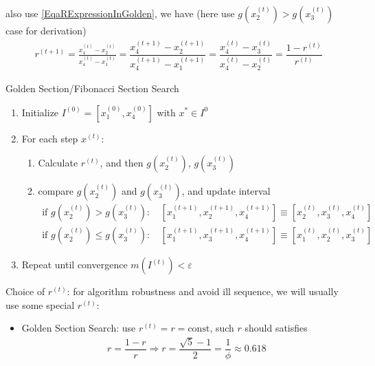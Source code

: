         also use \autoref{EqaRExpressionInGolden}, we have (here use $g(x_2^{(t)})> g(x_3^{(t)}) $ case for derivation)
        \begin{align}
            r^{(t+1)}=\frac{x_4^{(t)}-x_2^{(t)}}{x_4^{(t)}-x_1^{(t)}}=\dfrac{x_4^{(t+1)}-x_2^{(t+1)}}{x_4^{(t+1)}-x_1^{(t+1)}}=\dfrac{x_4^{(t)}-x_3^{(t)}}{x_4^{(t)}-x_2^{(t)}}=\dfrac{1-r^{(t)}}{r^{(t)}}
        \end{align}
        

\begin{algorithm}{Golden Section/Fibonacci Section Search}

\begin{enumerate}[topsep=2pt,itemsep=2pt]
    \item Initialize $ I^{(0)}=[x_1^{(0)},x_4^{(0)}] $ with $ x^*\in I^{0} $
    \item For each step $ x^{(t)} $:
    \begin{enumerate}[topsep=2pt,itemsep=2pt]
        \item Calculate $ r^{(t)} $, and then $ g(x_2^{(t)}) $, $ g(x_{3}^{(t)}) $
        \item compare $ g(x_2^{(t)}) $ and $ g(x_3^{(t)}) $, and update interval    
        \begin{align}
            \text{if }g(x_2^{(t)})>g(x_3^{(t)}):&\, [x_1^{(t+1)},x_2^{(t+1)},x_4^{(t+1)}]\equiv [x_2^{(t)},x_3^{(t)},x_4^{(t)}]\\
            \text{if }g(x_2^{(t)})\leq g(x_3^{(t)}):&\, [x_1^{(t+1)},x_3^{(t+1)},x_4^{(t+1)}]\equiv [x_1^{(t)},x_2^{(t)},x_3^{(t)}]
        \end{align}
    \end{enumerate}
    \item Repeat until convergence $ m(I^{(t)})<\varepsilon  $
\end{enumerate}
    

    Choice of $ r^{(t)} $: for algorithm robustness and avoid ill sequence, we will usually use some special $ r^{(t)} $:
\begin{itemize}[topsep=2pt,itemsep=0pt]
    \item Golden Section Search: use $ r^{(t)}=r=\mathrm{const}$, such $ r $ should satisfies
    \begin{align}
        r=\dfrac{1-r}{r}\Rightarrow r=\dfrac{\sqrt{5}-1}{2}=\dfrac{1}{\phi }\approx 0.618
    \end{align}


\end{itemize}
\end{algorithm}
